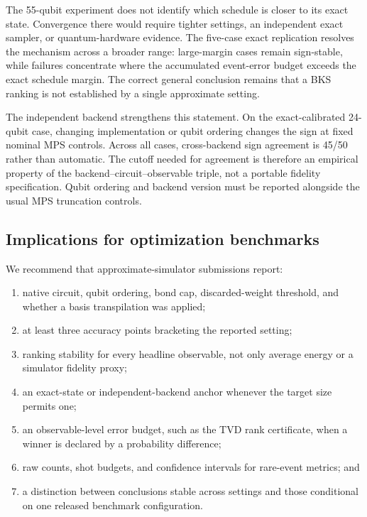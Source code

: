 \documentclass[10pt,twocolumn]{article}
\begin{document}
The 55-qubit experiment does not identify which schedule is closer to its exact
state. Convergence there would require tighter settings, an independent exact
sampler, or quantum-hardware evidence. The five-case exact replication resolves
the mechanism across a broader range: large-margin cases remain sign-stable,
while failures concentrate where the accumulated event-error budget exceeds
the exact schedule margin. The correct general conclusion remains that a BKS
ranking is not established by a single approximate setting.

The independent backend strengthens this statement. On the exact-calibrated
24-qubit case, changing implementation or qubit ordering changes the sign at
fixed nominal MPS controls. Across all cases, cross-backend sign agreement is
45/50 rather than automatic. The cutoff needed for agreement is therefore an
empirical property of the backend--circuit--observable triple, not a portable
fidelity specification. Qubit ordering and backend version must be reported
alongside the usual MPS truncation controls.

\subsection{Implications for optimization benchmarks}

We recommend that approximate-simulator submissions report:
\begin{enumerate}[leftmargin=*,nosep]
  \item native circuit, qubit ordering, bond cap, discarded-weight threshold,
  and whether a basis transpilation was applied;
  \item at least three accuracy points bracketing the reported setting;
  \item ranking stability for every headline observable, not only average
  energy or a simulator fidelity proxy;
  \item an exact-state or independent-backend anchor whenever the target size
  permits one;
  \item an observable-level error budget, such as the TVD rank certificate,
  when a winner is declared by a probability difference;
  \item raw counts, shot budgets, and confidence intervals for rare-event
  metrics; and
  \item a distinction between conclusions stable across settings and those
  conditional on one released benchmark configuration.
\end{enumerate}
\end{document}
